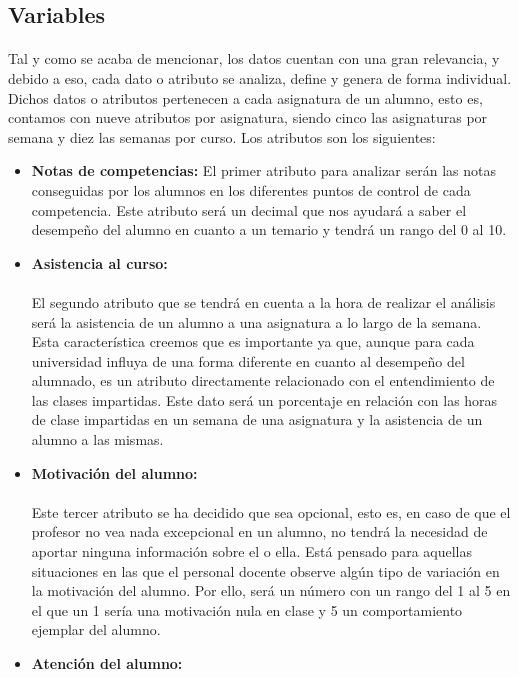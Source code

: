 \subsection{Variables}
\paragraph{}
Tal y como se acaba de mencionar, los datos cuentan con una gran
relevancia, y debido a eso, cada dato o atributo se analiza, define y
genera de forma individual. Dichos datos o atributos pertenecen a cada
asignatura de un alumno, esto es, contamos con nueve atributos por
asignatura, siendo cinco las asignaturas por semana y diez las semanas
por curso. Los atributos son los siguientes:

\begin{itemize}
\item \textbf{Notas de competencias:} El primer atributo para analizar
  serán las notas conseguidas por los alumnos en los diferentes puntos
  de control de cada competencia. Este atributo será un decimal que
  nos ayudará a saber el desempeño del alumno en cuanto a un temario y
  tendrá un rango del 0 al 10.
\item \textbf{Asistencia al curso:}
\paragraph{}
 El segundo atributo que se tendrá en cuenta a la hora de realizar el
 análisis será la asistencia de un alumno a una asignatura a lo largo
 de la semana. Esta característica creemos que es importante ya que,
 aunque para cada universidad influya de una forma diferente en cuanto
 al desempeño del alumnado, es un atributo directamente relacionado
 con el entendimiento de las clases impartidas. Este dato será un
 porcentaje en relación con las horas de clase impartidas en un semana
 de una asignatura y la asistencia de un alumno a las mismas.
\item \textbf{Motivación del alumno:}
\paragraph{}
Este tercer atributo se ha decidido que sea opcional, esto es, en caso
de que el profesor no vea nada excepcional en un alumno, no tendrá la
necesidad de aportar ninguna información sobre el o ella. Está pensado
para aquellas situaciones en las que el personal docente observe algún
tipo de variación en la motivación del alumno. Por ello, será un
número con un rango del 1 al 5 en el que un 1 sería una motivación
nula en clase y 5 un comportamiento ejemplar del alumno.
\item \textbf{Atención del alumno:}

\end{itemize}
